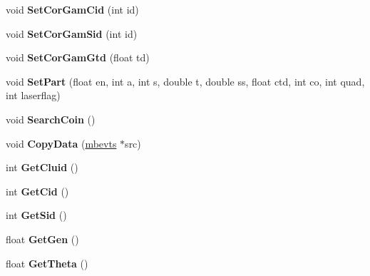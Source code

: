 \begin{DoxyCompactItemize}
\item 
\hypertarget{classmbevts_ad225b203c9ced65bf3560027da64386f}{void {\bfseries Set\-Cor\-Gam\-Cid} (int id)}\label{classmbevts_ad225b203c9ced65bf3560027da64386f}

\item 
\hypertarget{classmbevts_ac45f4603202f0ab85a53eaa5a673bef5}{void {\bfseries Set\-Cor\-Gam\-Sid} (int id)}\label{classmbevts_ac45f4603202f0ab85a53eaa5a673bef5}

\item 
\hypertarget{classmbevts_ad7d391a92762ab040292cb7b3e8418d2}{void {\bfseries Set\-Cor\-Gam\-Gtd} (float td)}\label{classmbevts_ad7d391a92762ab040292cb7b3e8418d2}

\item 
\hypertarget{classmbevts_ae50ea28b00271769bb542fca2fd64496}{void {\bfseries Set\-Part} (float en, int a, int s, double t, double ss, float ctd, int co, int quad, int laserflag)}\label{classmbevts_ae50ea28b00271769bb542fca2fd64496}

\item 
\hypertarget{classmbevts_a87461604de891dbc34c31fcd8af590af}{void {\bfseries Search\-Coin} ()}\label{classmbevts_a87461604de891dbc34c31fcd8af590af}

\item 
\hypertarget{classmbevts_a3dd5bb0d3f29f7aacf8fe47a999b145e}{void {\bfseries Copy\-Data} (\hyperlink{classmbevts}{mbevts} $\ast$src)}\label{classmbevts_a3dd5bb0d3f29f7aacf8fe47a999b145e}

\item 
\hypertarget{classmbevts_a1c5fb6ab284e545a6b217d62f0071704}{int {\bfseries Get\-Cluid} ()}\label{classmbevts_a1c5fb6ab284e545a6b217d62f0071704}

\item 
\hypertarget{classmbevts_a14e93c89cf1cd54c013258018408f502}{int {\bfseries Get\-Cid} ()}\label{classmbevts_a14e93c89cf1cd54c013258018408f502}

\item 
\hypertarget{classmbevts_a9d6088f98d2cbf47a2b800707f69d329}{int {\bfseries Get\-Sid} ()}\label{classmbevts_a9d6088f98d2cbf47a2b800707f69d329}

\item 
\hypertarget{classmbevts_a77ebeb78945522f0aeeb72f3ba1f7778}{float {\bfseries Get\-Gen} ()}\label{classmbevts_a77ebeb78945522f0aeeb72f3ba1f7778}

\item 
\hypertarget{classmbevts_aa960d2d6dcb37527ec7c61bb47ae7112}{float {\bfseries Get\-Theta} ()}\label{classmbevts_aa960d2d6dcb37527ec7c61bb47ae7112}


\end{DoxyCompactItemize}
